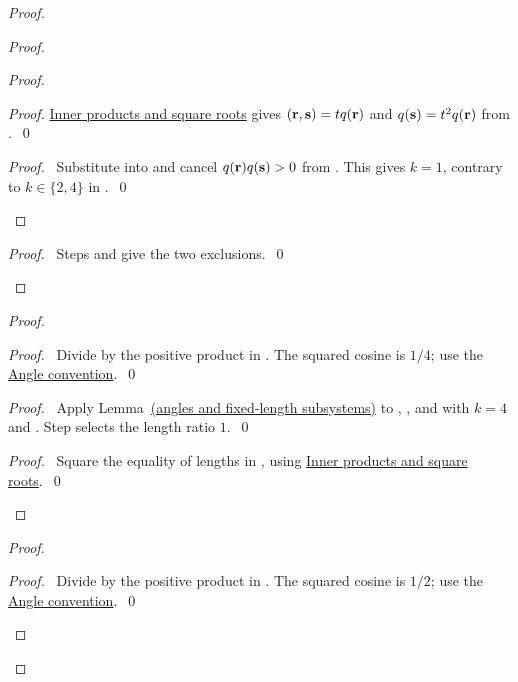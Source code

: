 \begin{mergedproofsection}
\begin{proof}
\begin{proof}
\begin{proof}
\begin{proof}
  \hyperref[facts:312-inner]{Inner products and square roots} gives
  $({\mathbf r},{\mathbf s})=tq({\mathbf r})$ and $q({\mathbf s})=t^2q({\mathbf r})$ from .~\qed\end{proof}
  \qedstep
  \begin{proof}\pf\ Substitute 
  into  and cancel $q({\mathbf r})q({\mathbf s})>0$ from
  . This gives $k=1$, contrary to
  $k\in\{2,4\}$ in .~\qed\end{proof}
 \end{proof}
 \qedstep
 \begin{proof}\pf\ Steps  and
  give the two exclusions.~\qed\end{proof}
\end{proof}
\begin{proof}
 \begin{proof}\pf\ Divide  by the positive product in
 . The squared cosine is $1/4$;
 use the \hyperref[facts:rem-angles]{Angle convention}.~\qed\end{proof}
 \begin{proof}\pf\ Apply Lemma~\hyperref[lem:angles]{(angles and fixed-length subsystems)}
 to , , and  with $k=4$
 and . Step  selects the
 length ratio $1$.~\qed\end{proof}
 \qedstep
 \begin{proof}\pf\ Square the equality of lengths in
 , using
 \hyperref[facts:312-inner]{Inner products and square roots}.~\qed\end{proof}
\end{proof}
\begin{proof}
 \begin{proof}\pf\ Divide  by the positive product in
 . The squared cosine is $1/2$;
 use the \hyperref[facts:rem-angles]{Angle convention}.~\qed\end{proof}

\end{proof}
\end{proof}
\end{mergedproofsection}
